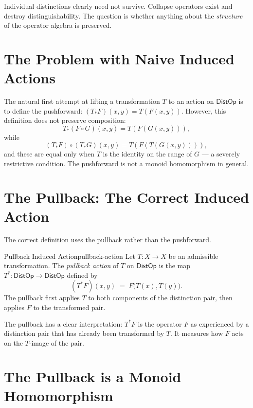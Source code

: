 \documentclass[12pt,twoside,openright]{book}
\newcommand{\distOp}{\mathsf{DistOp}}
\providecommand{\pullback}[2]{#1^{*}#2}
\begin{document}
Individual distinctions clearly need not survive. Collapse
operators exist and destroy distinguishability. The question is
whether anything about the \emph{structure} of the operator
algebra is preserved.

\section{The Problem with Naive Induced Actions}

The natural first attempt at lifting a transformation $T$ to
an action on $\distOp$ is to define the pushforward:
$(T_*F)(x,y)=T(F(x,y))$. However, this definition does not
preserve composition:
\[
  T_*(F\circ G)(x,y)
  = T(F(G(x,y))),
\]
while
\[
  (T_*F)\circ(T_*G)(x,y)
  = T(F(T(G(x,y)))),
\]
and these are equal only when $T$ is the identity on
the range of $G$ --- a severely restrictive condition. The
pushforward is not a monoid homomorphism in general.

\section{The Pullback: The Correct Induced Action}

The correct definition uses the pullback rather than the
pushforward.

\begin{definition}{Pullback Induced Action}{pullback-action}
Let $T:X\to X$ be an admissible transformation. The
\emph{pullback action} of $T$ on $\distOp$ is the map
$T^*:\distOp\to\distOp$ defined by
\[
  (\pullback{T}{F})(x,y)
  \;=\;
  F\bigl(T(x),T(y)\bigr).
\]
The pullback first applies $T$ to both components of the
distinction pair, then applies $F$ to the transformed pair.
\end{definition}

The pullback has a clear interpretation: $\pullback{T}{F}$
is the operator $F$ as experienced by a distinction pair that
has already been transformed by $T$. It measures how $F$
acts on the $T$-image of the pair.

\section{The Pullback is a Monoid Homomorphism}
\end{document}
